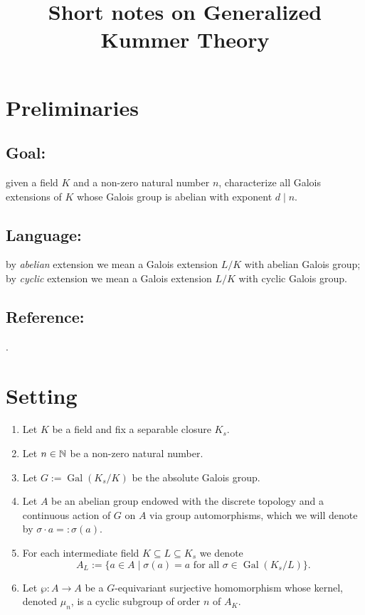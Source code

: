 \documentclass[12pt]{amsart}
\DeclareMathOperator{\Gal}{Gal}
\begin{document}
\title{Short notes on Generalized Kummer Theory}
\maketitle

\section{Preliminaries}

\subsection*{Goal:} given a field $K$ and a non-zero natural number $n$, characterize all Galois extensions of $K$ whose Galois group is abelian with exponent $d\mid n$.

\subsection*{Language:} by \textit{abelian} extension we mean a Galois extension $L/K$ with abelian Galois group; by \textit{cyclic} extension we mean a Galois extension $L/K$ with cyclic Galois group.

\subsection*{Reference:} \cite[\S 4.10]{bos18}.

\section{Setting}

\begin{enumerate}
    \item Let $K$ be a field and fix a separable closure $K_{s}$.
    \item Let $n\in \mathbb{N}$ be a non-zero natural number.
    \item Let $G:=\Gal(K_{s}/K)$ be the absolute Galois group.
    \item Let $A$ be an abelian group endowed with the discrete topology and a continuous action of $G$ on $A$ via group automorphisms, which we will denote by $\sigma \cdot a=:\sigma(a)$.
    \item For each intermediate field $K\subseteq L\subseteq K_{s}$ we denote
	\[ A_{L}:=\{ a\in A\mid \sigma(a)=a \text{ for all }\sigma\in \Gal(K_{s}/L)\}. \]
    \item Let $\wp\colon A\to A$ be a $G$-equivariant surjective homomorphism whose kernel, denoted $\mu_{n}$, is a cyclic subgroup of order $n$ of $A_{K}$.
\end{enumerate}
\end{document}
